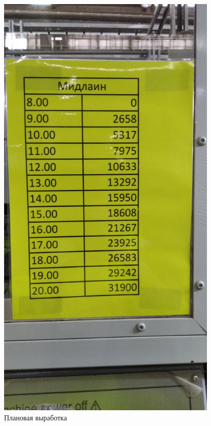 \begin{figure}
\begin{center}
  \includegraphics[height=0.94\textheight, width=0.94\textwidth, keepaspectratio]{Pics 1/4 План выработки в шт..jpg}
\end{center}
  \caption{Плановая выработка}
  \label{pic:4 План выработки в шт}
\end{figure}

